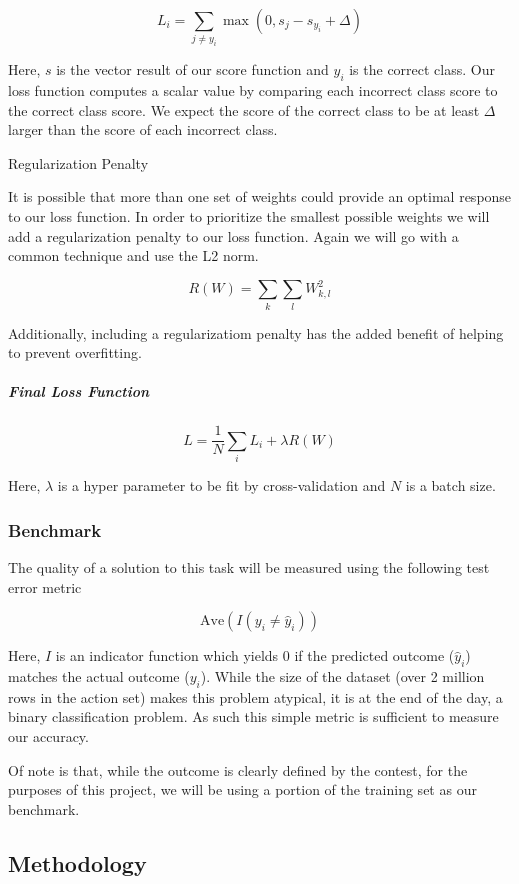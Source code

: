 \documentclass[]{report}
\begin{document}
\[L_i=\sum_{j\neq y_i}\max(0,s_j-s_{y_i}+\Delta)\]

Here, $s$ is the vector result of our score function and $y_i$ is the
correct class. Our loss function computes a scalar value by comparing
each incorrect class score to the correct class score. We expect the
score of the correct class to be at least $\Delta$ larger than the score
of each incorrect class.

Regularization Penalty

It is possible that more than one set of weights could provide an
optimal response to our loss function. In order to prioritize the
smallest possible weights we will add a regularization penalty to our
loss function. Again we will go with a common technique and use the L2
norm.

\[R(W)=\sum_k\sum_lW^2_{k,l}\]

Additionally, including a regularizatiom penalty has the added benefit
of helping to prevent overfitting.

\subparagraph{Final Loss Function}\label{final-loss-function}

\[L=\frac{1}{N}\sum_iL_i+\lambda R(W)\]

Here, $\lambda$ is a hyper parameter to be fit by cross-validation and
$N$ is a batch size.

\subsubsection{Benchmark}\label{benchmark}

The quality of a solution to this task will be measured using the
following test error metric

\[\text{Ave}(I(y_i\neq\hat{y}_i))\]

Here, $I$ is an indicator function which yields 0 if the predicted
outcome ($\hat{y}_i$) matches the actual outcome ($y_i$). While the size
of the dataset (over 2 million rows in the action set) makes this
problem atypical, it is at the end of the day, a binary classification
problem. As such this simple metric is sufficient to measure our
accuracy.

Of note is that, while the outcome is clearly defined by the contest,
for the purposes of this project, we will be using a portion of the
training set as our benchmark.

\subsection{Methodology}\label{methodology}
\end{document}
